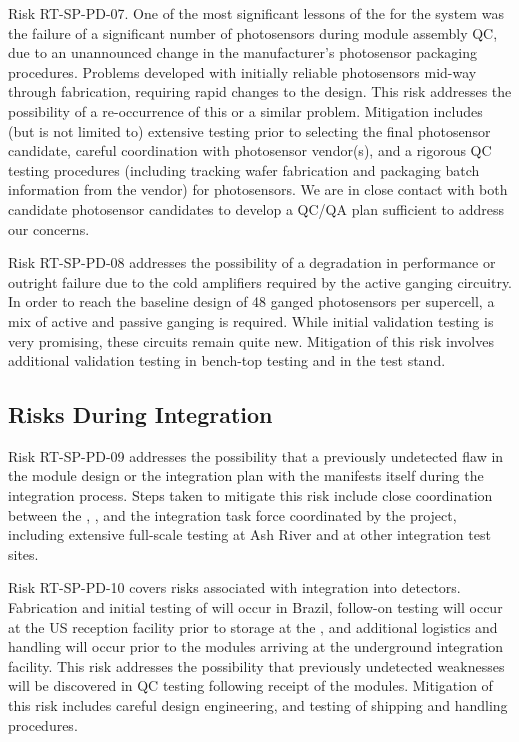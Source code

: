 Risk RT-SP-PD-07.  One of the most significant lessons of the  for the  system was the failure of a significant number of photosensors during module assembly QC, due to an unannounced change in the manufacturer's photosensor packaging procedures.  Problems developed with initially reliable photosensors mid-way through fabrication, requiring rapid changes to the  design.  This risk addresses the possibility of a re-occurrence of this or a similar problem.  Mitigation includes (but is not limited to) extensive  testing prior to selecting the final photosensor candidate, careful coordination with photosensor vendor(s), and a rigorous QC testing procedures (including tracking wafer fabrication and packaging batch information from the vendor) for photosensors.  We are in close contact with both candidate photosensor candidates to develop a QC/QA plan sufficient to address our concerns.


Risk RT-SP-PD-08 addresses the possibility of a degradation in  performance or outright failure due to the cold amplifiers required by the active ganging circuitry.  In order to reach the baseline design of 48 ganged photosensors per  supercell, a mix of active and passive ganging is required.  While initial validation testing is very promising, these circuits remain quite new.  Mitigation of this risk involves additional validation testing in bench-top testing and in the  test stand.

\subsection{Risks During Integration}

Risk RT-SP-PD-09 addresses the possibility that a previously undetected flaw in the  module design or the integration plan with the  manifests itself during the integration process.  Steps taken to mitigate this risk include close coordination between the , ,  and the integration task force coordinated by the project, including extensive full-scale testing at Ash River and at other integration test sites.

Risk RT-SP-PD-10 covers risks associated with integration into  detectors.  Fabrication and initial testing of  will occur in Brazil, follow-on testing will occur at the US reception facility prior to storage at the , and additional logistics and handling will occur prior to the modules arriving at the underground integration facility. This risk addresses the possibility that previously undetected weaknesses will be discovered in QC testing following receipt of the modules.  Mitigation of this risk includes careful design engineering, and testing of shipping and handling procedures.


